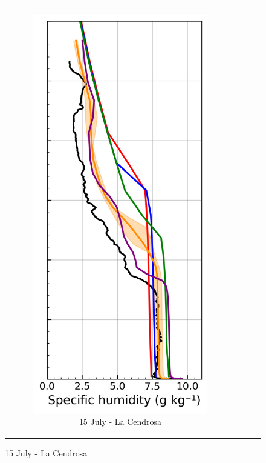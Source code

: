 \begin{figure}[hbtp]
{\begin{tabular}{@{}cccc@{}}
\begin{subfigure}[t]{0.289\textwidth}
            \caption{15 July - La Cendrosa}
            \includegraphics[width=\textwidth]{images/chap6/profiles/profile_cendrosa_ovap_1507_.png}

\end{subfigure}
\end{tabular}}
\end{figure}
